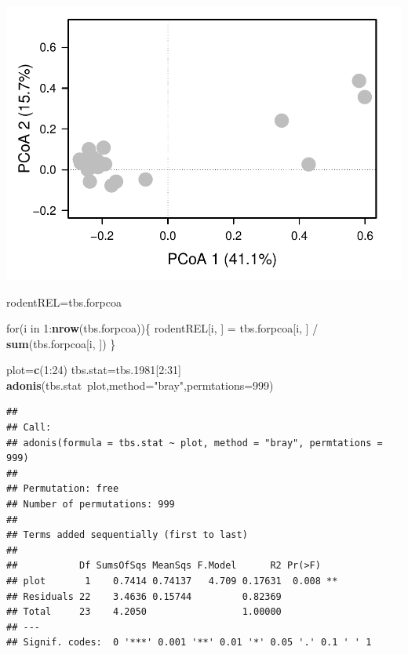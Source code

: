 \documentclass[]{article}
\newenvironment{Shaded}{\begin{snugshade}}{\end{snugshade}}
\newcommand{\KeywordTok}[1]{\textcolor[rgb]{0.13,0.29,0.53}{\textbf{{#1}}}}
\newcommand{\DataTypeTok}[1]{\textcolor[rgb]{0.13,0.29,0.53}{{#1}}}
\newcommand{\DecValTok}[1]{\textcolor[rgb]{0.00,0.00,0.81}{{#1}}}
\newcommand{\FloatTok}[1]{\textcolor[rgb]{0.00,0.00,0.81}{{#1}}}
\newcommand{\StringTok}[1]{\textcolor[rgb]{0.31,0.60,0.02}{{#1}}}
\newcommand{\NormalTok}[1]{{#1}}
\begin{document}
\includegraphics{temporal_assignment_files/figure-latex/unnamed-chunk-3-1.pdf}

\begin{Shaded}
\begin{Highlighting}[]
\NormalTok{rodentREL=tbs.forpcoa}

  \NormalTok{for(i in }\DecValTok{1}\NormalTok{:}\KeywordTok{nrow}\NormalTok{(tbs.forpcoa))\{}
    \NormalTok{rodentREL[i, ] =}\StringTok{ }\NormalTok{tbs.forpcoa[i, ] /}\StringTok{ }\KeywordTok{sum}\NormalTok{(tbs.forpcoa[i, ]) }
  \NormalTok{\}}

\NormalTok{plot=}\KeywordTok{c}\NormalTok{(}\DecValTok{1}\NormalTok{:}\DecValTok{24}\NormalTok{)}
\NormalTok{tbs.stat=tbs}\FloatTok{.1981}\NormalTok{[}\DecValTok{2}\NormalTok{:}\DecValTok{31}\NormalTok{]}
\KeywordTok{adonis}\NormalTok{(tbs.stat~plot,}\DataTypeTok{method=}\StringTok{"bray"}\NormalTok{,}\DataTypeTok{permtations=}\DecValTok{999}\NormalTok{)}
\end{Highlighting}
\end{Shaded}

\begin{verbatim}
## 
## Call:
## adonis(formula = tbs.stat ~ plot, method = "bray", permtations = 999) 
## 
## Permutation: free
## Number of permutations: 999
## 
## Terms added sequentially (first to last)
## 
##           Df SumsOfSqs MeanSqs F.Model      R2 Pr(>F)   
## plot       1    0.7414 0.74137   4.709 0.17631  0.008 **
## Residuals 22    3.4636 0.15744         0.82369          
## Total     23    4.2050                 1.00000          
## ---
## Signif. codes:  0 '***' 0.001 '**' 0.01 '*' 0.05 '.' 0.1 ' ' 1
\end{verbatim}
\end{document}

